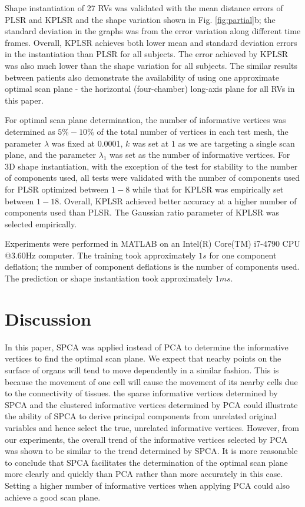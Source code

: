 \documentclass[review]{elsarticle}
\begin{document}
Shape instantiation of 27 RVs was validated with the mean distance errors of PLSR and KPLSR and the shape variation shown in Fig. \ref{fig:partial}b; the standard deviation in the graphs was from the error variation along different time frames. Overall, KPLSR achieves both lower mean and standard deviation errors in the instantiation than PLSR for all subjects. The error achieved by KPLSR was also much lower than the shape variation for all subjects. The similar results between patients also demonstrate the availability of using one approximate optimal scan plane - the horizontal (four-chamber) long-axis plane for all RVs in this paper.

For optimal scan plane determination, the number of informative vertices was determined as $5\%-10\%$ of the total number of vertices in each test mesh, the parameter $\lambda$ was fixed at 0.0001, $k$ was set at $1$ as we are targeting a single scan plane, and the parameter $\lambda_1$ was set as the number of informative vertices. For 3D shape instantiation, with the exception of the test for stability to the number of components used, all tests were validated with the number of components used for PLSR optimized between $1-8$ while that for KPLSR was empirically set between $1-18$. Overall, KPLSR achieved better accuracy at a higher number of components used than PLSR. The Gaussian ratio parameter of KPLSR was selected empirically. 

Experiments were performed in MATLAB on an Intel(R) Core(TM) i7-4790 CPU @3.60Hz computer. The training took approximately $1s$ for one component deflation; the number of component deflations is the number of components used. The prediction or shape instantiation took approximately $1ms$.

\section{Discussion}
In this paper, SPCA was applied instead of PCA to determine the informative vertices to find the optimal scan plane. We expect that nearby points on the surface of organs will tend to move dependently in a similar fashion. This is because the movement of one cell will cause the movement of its nearby cells due to the connectivity of tissues. the sparse informative vertices determined by SPCA and the clustered informative vertices determined by PCA could illustrate the ability of SPCA to derive principal components from unrelated original variables and hence select the true, unrelated informative vertices. However, from our experiments, the overall trend of the informative vertices selected by PCA was shown to be similar to the trend determined by SPCA. It is more reasonable to conclude that SPCA facilitates the determination of the optimal scan plane more clearly and quickly than PCA rather than more accurately in this case. Setting a higher number of informative vertices when applying PCA could also achieve a good scan plane. 
\end{document}
